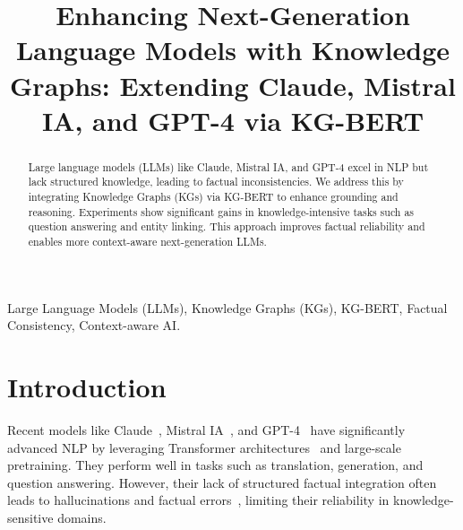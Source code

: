 \documentclass[conference]{IEEEtran}
\begin{document}
\title{Enhancing Next-Generation Language Models with Knowledge Graphs: Extending Claude, Mistral IA, and GPT-4 via KG-BERT\\
}

\author{
\and
{}

}

\maketitle

\begin{abstract}
Large language models (LLMs) like Claude, Mistral IA, and GPT-4 excel in NLP but lack structured knowledge, leading to factual inconsistencies. We address this by integrating Knowledge Graphs (KGs) via KG-BERT to enhance grounding and reasoning. Experiments show significant gains in knowledge-intensive tasks such as question answering and entity linking. This approach improves factual reliability and enables more context-aware next-generation LLMs.
\end{abstract}

\begin{IEEEkeywords}
Large Language Models (LLMs), Knowledge Graphs (KGs), KG-BERT, Factual Consistency, Context-aware AI.
\end{IEEEkeywords}

\section{Introduction}
Recent models like Claude~\cite{anthropic2023}, Mistral IA~\cite{mistral2023}, and GPT-4~\cite{openai2023} have significantly advanced NLP by leveraging Transformer architectures~\cite{brown2020} and large-scale pretraining. They perform well in tasks such as translation, generation, and question answering. However, their lack of structured factual integration often leads to hallucinations and factual errors~\cite{zellers2019}, limiting their reliability in knowledge-sensitive domains.
\end{document}
